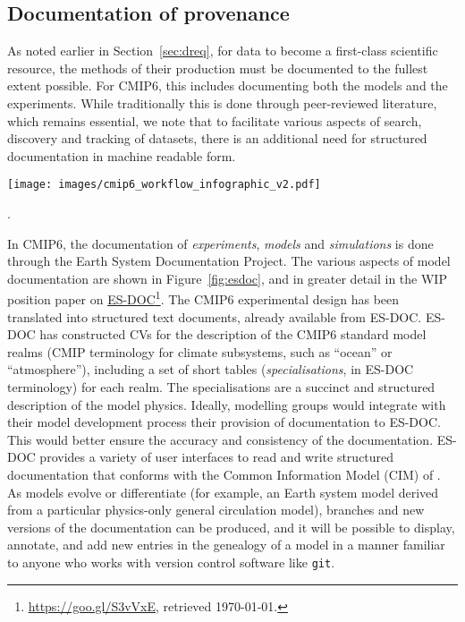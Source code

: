 \documentclass[gmd,manuscript]{copernicus}
\newcommand{\urlref}[2] {\href{#1}{#2}\footnote{\url{#1}, retrieved \today.}}
\begin{document}
\subsection{Documentation of provenance}
\label{sec:doc}

As noted earlier in Section~\ref{sec:dreq}, for data to become a
first-class scientific resource, the methods of their production must
be documented to the fullest extent possible. For CMIP6, this includes
documenting both the models and the experiments. While traditionally
this is done through peer-reviewed literature, which remains
essential, we note that to facilitate various aspects of search,
discovery and tracking of datasets, there is an additional need for
structured documentation in machine readable form.

\begin{figure*}
  \begin{center}
    \texttt{[image: images/cmip6\_workflow\_infographic\_v2.pdf]}
  \end{center}
  \caption{Elements of ES-DOC documentation. Rows indicate phases of
    the modelling process being documented, and box colors indicate the
    parties responsible for producing the documentation (see legend).
    Figure courtesy Guillaume Levavasseur, IPSL}.
  \label{fig:esdoc}
\end{figure*}

In CMIP6, the documentation of \emph{experiments}, \emph{models} and
\emph{simulations} is done through the Earth System Documentation
\citep[\urlref{https://goo.gl/WNwKD9}{ES-DOC},][]{ref:guilyardietal2013}
Project. The various aspects of model documentation are shown in
Figure~\ref{fig:esdoc}, and in greater detail in the WIP position
paper on \urlref{https://goo.gl/S3vVxE}{ES-DOC}. The CMIP6
experimental design has been translated into structured text
documents, already available from ES-DOC. ES-DOC has constructed CVs
for the description of the CMIP6 standard model realms
(CMIP terminology for climate subsystems, such as ``ocean'' or
``atmosphere''), including a set of short tables
(\emph{specialisations}, in ES-DOC terminology) for each realm.
The specialisations are a succinct and structured description of the
model physics. Ideally, modelling groups would integrate with their
model development process their provision of documentation to ES-DOC.
This would better ensure the accuracy and consistency of the
documentation. ES-DOC provides a variety of user interfaces to read
and write structured documentation that conforms with the Common
Information Model (CIM) of \cite{ref:lawrenceetal2012}. As models
evolve or differentiate (for example, an Earth system model derived
from a particular physics-only general circulation model), branches and new
versions of the documentation can be produced,
and it will be possible to display, annotate, and add new entries in
the genealogy of a model in a manner familiar to anyone who works with
version control software like \texttt{git}.
\end{document}
